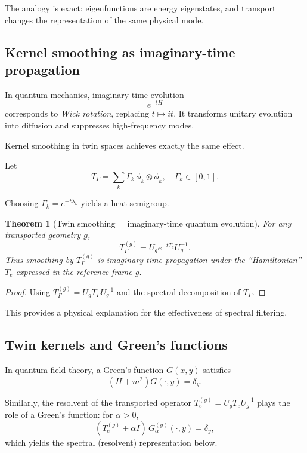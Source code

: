 \documentclass[11pt]{article}
\newtheorem{theorem}{Theorem}[section]
\theoremstyle{definition}
\begin{document}
The analogy is exact: eigenfunctions are energy eigenstates, and transport changes the representation of the same physical mode.

\subsection{Kernel smoothing as imaginary-time propagation}

In quantum mechanics, imaginary-time evolution
\[
e^{-tH}
\]
corresponds to \emph{Wick rotation}, replacing $t\mapsto it$.
It transforms unitary evolution into diffusion and suppresses high-frequency modes.

Kernel smoothing in twin spaces achieves exactly the same effect.

Let
\[
T_\Gamma = \sum_{k} \Gamma_k\, \phi_k\otimes \phi_k,
\quad
\Gamma_k\in[0,1].
\]

Choosing $\Gamma_k = e^{-t\lambda_k}$ yields a heat semigroup.

\begin{theorem}[Twin smoothing = imaginary-time quantum evolution]
	For any transported geometry $g$,
	\[
	T_\Gamma^{(g)} = U_g e^{-t T_e} U_g^{-1}.
	\]
	Thus smoothing by $T_\Gamma^{(g)}$ is imaginary-time propagation under the “Hamiltonian” $T_e$ expressed in the reference frame $g$.
\end{theorem}

\begin{proof}
	Using $T_\Gamma^{(g)} = U_g T_\Gamma U_g^{-1}$ and the spectral decomposition of $T_\Gamma$.
\end{proof}

This provides a physical explanation for the effectiveness of spectral filtering.

\subsection{Twin kernels and Green's functions}

In quantum field theory, a Green’s function $G(x,y)$ satisfies
\[
(H+m^2) G(\cdot,y) = \delta_y.
\]

Similarly, the resolvent of the transported operator $T_e^{(g)} = U_g T_e U_g^{-1}$
plays the role of a Green's function: for $\alpha>0$,
\[
(T_e^{(g)} + \alpha I)\, G_\alpha^{(g)}(\cdot,y) = \delta_y,
\]
which yields the spectral (resolvent) representation below.
\end{document}
